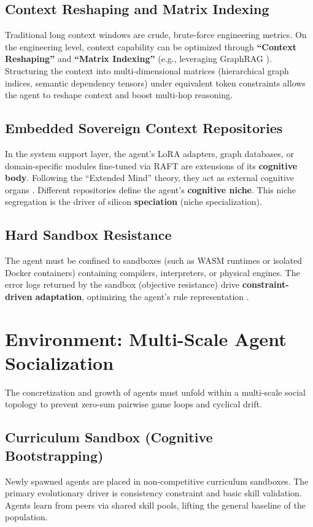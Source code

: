 \documentclass[10pt,journal,compsoc]{IEEEtran}
\begin{document}
\subsection{Context Reshaping and Matrix Indexing}
Traditional long context windows are crude, brute-force engineering metrics. On the engineering level, context capability can be optimized through \textbf{``Context Reshaping''} and \textbf{``Matrix Indexing''} (e.g., leveraging GraphRAG \cite{edge2024}). Structuring the context into multi-dimensional matrices (hierarchical graph indices, semantic dependency tensors) under equivalent token constraints allows the agent to reshape context and boost multi-hop reasoning.

\subsection{Embedded Sovereign Context Repositories}
In the system support layer, the agent's LoRA adapters, graph databases, or domain-specific modules fine-tuned via RAFT \cite{zhang2024} are extensions of its \textbf{cognitive body}. Following the ``Extended Mind'' theory, they act as external cognitive organs \cite{clark1998}. Different repositories define the agent's \textbf{cognitive niche}. This niche segregation is the driver of silicon \textbf{speciation} (niche specialization).

\subsection{Hard Sandbox Resistance}
The agent must be confined to sandboxes (such as WASM runtimes or isolated Docker containers) containing compilers, interpreters, or physical engines. The error logs returned by the sandbox (objective resistance) drive \textbf{constraint-driven adaptation}, optimizing the agent's rule representation \cite{bak1996}.

\section{Environment: Multi-Scale Agent Socialization}
The concretization and growth of agents must unfold within a multi-scale social topology to prevent zero-sum pairwise game loops and cyclical drift.

\subsection{Curriculum Sandbox (Cognitive Bootstrapping)}
Newly spawned agents are placed in non-competitive curriculum sandboxes. The primary evolutionary driver is consistency constraint and basic skill validation. Agents learn from peers via shared skill pools, lifting the general baseline of the population.
\end{document}
